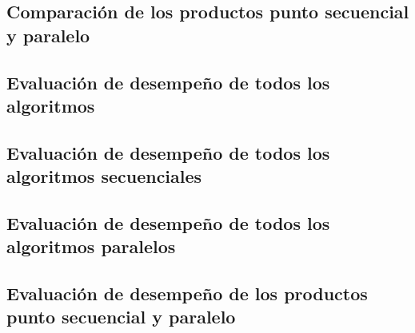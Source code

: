 \documentclass[conference]{IEEEtran}
\begin{document}
\subsection{Comparación de los productos punto secuencial y paralelo}
\subsection{Evaluación de desempeño de todos los algoritmos}
\subsection{Evaluación de desempeño de todos los algoritmos secuenciales}
\subsection{Evaluación de desempeño de todos los algoritmos paralelos}
\subsection{Evaluación de desempeño de los productos punto secuencial y paralelo}


 
\end{document}
